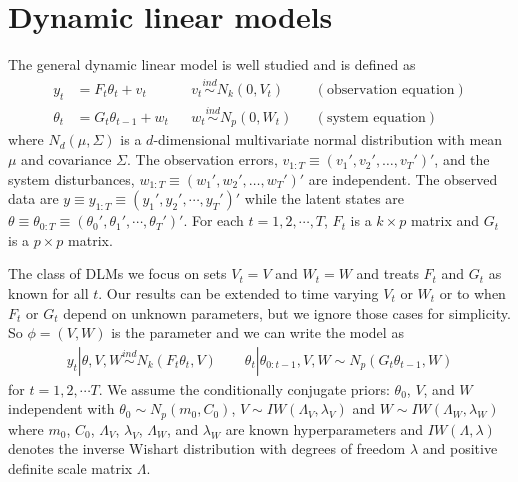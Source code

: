\documentclass[12pt]{article}
\begin{document}
\section{Dynamic linear models} \label{sec:DLM}

The general dynamic linear model is well studied \citep{harrison1999bayesian,petris2009dynamic,prado2010time} and is defined as \vspace{-.3cm}
\begin{align*}
y_t &= F_t\theta_t + v_t && v_t \stackrel{ind}{\sim} N_k(0,V_t) && (\mbox{observation equation}) \\ 
 \theta_t &= G_t\theta_{t-1} + w_t && w_t \stackrel{ind}{\sim} N_p(0,W_t) && (\mbox{system equation}) 
\end{align*}
where $N_d(\mu,\Sigma)$ is a $d$-dimensional multivariate normal distribution with mean $\mu$ and covariance $\Sigma$. The observation errors, $v_{1:T}\equiv(v_1',v_2',\dots,v_T')'$, and the system disturbances, $w_{1:T}\equiv(w_1',w_2',\dots,w_T')'$  are independent. The observed data are $y\equiv y_{1:T} \equiv (y_1',y_2',\cdots, y_T')'$ while the latent states are $\theta \equiv \theta_{0:T} \equiv (\theta_0',\theta_1',\cdots, \theta_T')'$. For each $t=1,2,\cdots,T$, $F_t$ is a $k\times p$ matrix and $G_t$ is a $p\times p$ matrix. %

The class of DLMs we focus on sets $V_t=V$ and $W_t=W$ and treats $F_{t}$ and $G_{t}$ as known for all $t$. Our results can be extended to time varying $V_t$ or $W_t$ or to when $F_t$ or $G_t$ depend on unknown parameters, but we ignore those cases for simplicity. So $\phi=(V,W)$ is the parameter and we can write the model as \vspace{-.3cm}
\begin{align}
y_t|\theta,V,W \stackrel{ind}{\sim}  N_k(F_t\theta_t,V) \qquad \theta_t|\theta_{0:t-1},V,W  \sim  N_p(G_t\theta_{t-1},W) \label{dlmbotheqs}
\end{align}
for $t=1,2,\cdots T$. We assume the conditionally conjugate priors: $\theta_0$, $V$, and $W$ independent with $\theta_0 \sim N_p(m_0, C_0)$, $V \sim IW(\Lambda_V, \lambda_V)$ and $W \sim IW(\Lambda_W, \lambda_W)$ where $m_0$, $C_0$, $\Lambda_V$, $\lambda_V$, $\Lambda_W$, and $\lambda_W$ are known hyperparameters and $IW(\Lambda, \lambda)$ denotes the inverse Wishart distribution with degrees of freedom $\lambda$ and positive definite scale matrix $\Lambda$.
\end{document}
